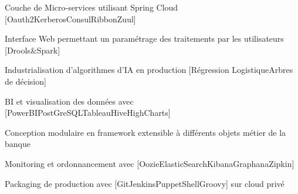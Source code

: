 \begin{cventries}
{\begin{cvsubentries}
{\begin{cvitems}
	\item {Couche de Micro-services utilisant Spring Cloud [\scriptsize Oauth2{\enskip\cdotp\enskip}Kerberos{\enskip\cdotp\enskip}Consul{\enskip\cdotp\enskip}Ribbon{\enskip\cdotp\enskip}Zuul]}
	\item {Interface Web permettant un paramétrage des traitements par les utilisateurs [Drools\&Spark] }
	\item {Industrialisation d'algorithmes d'IA en production [Régression Logistique{\enskip\cdotp\enskip}Arbres de décision] }
	\item {BI et visualisation des données avec [PowerBI{\enskip\cdotp\enskip}PostGreSQL{\enskip\cdotp\enskip}Tableau{\enskip\cdotp\enskip}Hive{\enskip\cdotp\enskip}HighCharts]}
	\item {Conception modulaire en framework extensible à différents objets métier de la banque}
	\item {Monitoring et ordonnancement avec [\scriptsize Oozie{\enskip\cdotp\enskip}ElasticSearch{\enskip\cdotp\enskip}Kibana{\enskip\cdotp\enskip}Graphana{\enskip\cdotp\enskip}Zipkin] }
	\item {Packaging de production avec [Git{\enskip\cdotp\enskip}Jenkins{\enskip\cdotp\enskip}Puppet{\enskip\cdotp\enskip}Shell{\enskip\cdotp\enskip}Groovy] sur cloud privé}

\end{cvitems}}
\end{cvsubentries}}
\end{cventries}
